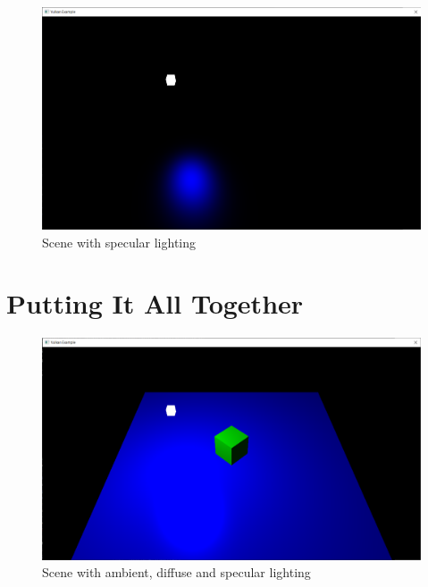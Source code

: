 \begin{minipage}{\linewidth}{\noindent}
    
\end{minipage}

\begin{figure}[ht]
    \centering
    \includegraphics[scale=0.25]{images/ChBlinnPhong/SceneSpecular.png}
    \caption{Scene with specular lighting}
    \label{fig::SceneSpecular}
\end{figure}

\section{Putting It All Together}

\begin{figure}[ht]
    \centering
    \includegraphics[scale=0.25]{images/ChBlinnPhong/SceneLit.png}
    \caption{Scene with ambient, diffuse and specular lighting}
    \label{fig::SceneLit}
\end{figure}

